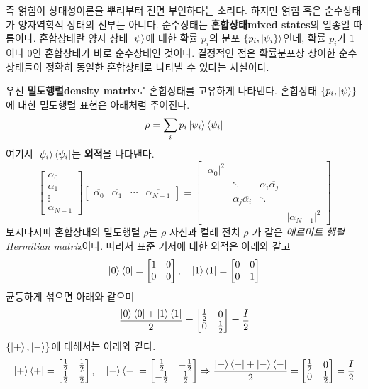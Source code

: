 \documentclass[a4paper,chapter,atbegshi]{oblivoir}
\begin{document}
즉 얽힘이 상대성이론을 뿌리부터 전면 부인하다는 소리다.
하지만 얽힘 혹은 순수상태가 양자역학적 상태의 전부는 아니다. 순수상태는
\textbf{혼합상태\tiny mixed states}의 일종일 따름이다. 혼합상태란
양자 상태 $\ket{\psi}$에 대한 확률 $p_i$의 분포 $\{p_i,\ket{\psi_i\}}$인데,
확률 $p_i$가 $1$이나 $0$인 혼합상태가 바로 순수상태인 것이다. 결정적인 점은
확률분포상 상이한 순수상태들이 정확히 동일한 혼합상태로 나타낼 수 있다는
사실이다.

우선 \textbf{밀도행렬\tiny density matrix}로 혼합상태를 고유하게 나타낸다.
혼합상태 $\{p_i,\ket{\psi}\}$에 대한 밀도행렬 표현은 아래처럼 주어진다. 
\begin{equation}
  \rho = \sum_i p_i\ket{\psi_i}\bra{\psi_i}
\end{equation}
여기서 $\ket{\psi_i}\bra{\psi_i}$는 \textbf{외적}을 나타낸다.
\[
  \begin{bmatrix}\alpha_0\\\alpha_1\\\vdots\\\alpha_{N-1}\end{bmatrix}
  \begin{bmatrix}\overline{\alpha_0} & \overline{\alpha_1} &\cdots 
  &\overline{\alpha_{N-1}}\end{bmatrix} = \begin{bmatrix}
    |\alpha_0|^2 & & &  \\
    & \ddots & \alpha_i\overline{\alpha_j}& \\
    &\alpha_j\overline{\alpha_i}&\ddots&\\
    &&&|\alpha_{N-1}|^2
  \end{bmatrix}
\]
보시다시피 혼합상태의 밀도행렬 $\rho$는 $\rho$ 자신과 켤레 전치 $\rho^{\dagger}$가
같은 \emph{에르미트 행렬\tiny Hermitian matrix}이다. 따라서 표준 기저에 
대한 외적은 아래와 같고
\[
  \ket0\bra0=\begin{bmatrix}1&0\\0&0\end{bmatrix},\quad
  \ket1\bra1=\begin{bmatrix}0&0\\0&1\end{bmatrix}
\]
균등하게 섞으면 아래와 같으며
\[
  \frac{\ket0\bra0+\ket1\bra1}{2} =
  \begin{bmatrix}\frac{1}{2}&0\\0&\frac{1}{2}\end{bmatrix}
  =\frac{I}{2}
\]
$\{\ket+,\ket-\}$에 대해서는 아래와 같다.
\[
  \ket+\bra+=\begin{bmatrix}\frac{1}{2}&\frac{1}{2}\\\frac{1}{2}&\frac{1}{2}\end{bmatrix},\quad
  \ket-\bra-=\begin{bmatrix}\frac{1}{2}&-\frac{1}{2}\\-\frac{1}{2}&\frac{1}{2}\end{bmatrix}
  \Rightarrow\frac{\ket+\bra++\ket-\bra-}{2}=\begin{bmatrix}\frac{1}{2}&0\\0&\frac{1}{2}\end{bmatrix}=\frac{I}{2}
\]
\end{document}
